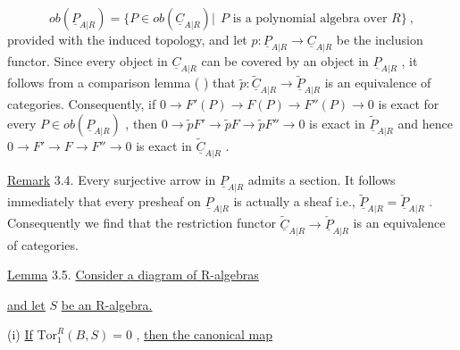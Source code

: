 \begin{equation*}
ob(\underline{P}_{A|R}) = \{P \in ob(\underline{C}_{A|R})|\ \ P \text{ is a polynomial algebra over } R\} \ ,
\end{equation*}
provided with the induced topology, and let  $p : \underline{P}_{A|R} \to \underline{C}_{A|R}$  be the inclusion functor. Since every object in  $\underline{C}_{A|R}$  can be covered by an object in  $\underline{P}_{A|R}$ , it follows from a comparison lemma (          ) that  $\widetilde{p} : \widetilde{\underline{C}}_{A|R} \to \widetilde{\underline{P}}_{A|R}$  is an equivalence of categories. Consequently, if  $0 \to F'(P) \to F(P) \to F''(P) \to 0$  is exact for every  $P \in ob(\underline{P}_{A|R})$ , then  $0 \to \widetilde{p}F' \to \widetilde{p}F \to \widetilde{p}F'' \to 0$  is exact in  $\widetilde{\underline{P}}_{A|R}$  and hence  $0 \to F' \to F \to F'' \to 0$  is exact in  $\widetilde{\underline{C}}_{A|R}$  .



\underline{Remark} 3.4.  Every surjective arrow in  $\underline{P}_{A|R}$  admits a section. It follows immediately that every presheaf on  $\underline{P}_{A|R}$  is actually a sheaf i.e.,  $\widetilde{\underline{P}}_{A|R} = \check{\underline{P}}_{A|R}$ . Consequently we find that the restriction functor  $\widetilde{\underline{C}}_{A|R} \to \check{\underline{P}}_{A|R}$  is an equivalence of categories.

\underline{Lemma} 3.5.  \underline{Consider a diagram of R-algebras}

\begin{center}
\end{center}
\underline{and let}  $S$  \underline{be an R-algebra.}

(i)  \underline{If}  $\mathrm{Tor}^{R}_{1}(B,S) = 0$  , \underline{then the canonical map}

